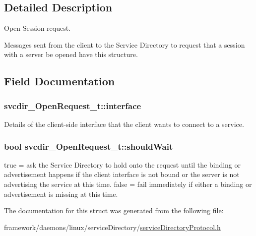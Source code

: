 \subsection{Detailed Description}
Open Session request.

Messages sent from the client to the Service Directory to request that a session with a server be opened have this structure. 

\subsection{Field Documentation}
\subsubsection[{\texorpdfstring{interface}{interface}}]{ svcdir\+\_\+\+Open\+Request\+\_\+t\+::interface}\hypertarget{structsvcdir___open_request__t_a2fc2736d6a0bb2bc23bd4aeee137b48d}{}\label{structsvcdir___open_request__t_a2fc2736d6a0bb2bc23bd4aeee137b48d}
Details of the client-\/side interface that the client wants to connect to a service. 
\subsubsection[{\texorpdfstring{should\+Wait}{shouldWait}}]{\setlength{\rightskip}{0pt plus 5cm}bool svcdir\+\_\+\+Open\+Request\+\_\+t\+::should\+Wait}\hypertarget{structsvcdir___open_request__t_aa6ac4a72f9f214a9a13995de28efeba8}{}\label{structsvcdir___open_request__t_aa6ac4a72f9f214a9a13995de28efeba8}
true = ask the Service Directory to hold onto the request until the binding or advertisement happens if the client interface is not bound or the server is not advertising the service at this time. false = fail immediately if either a binding or advertisement is missing at this time. 

The documentation for this struct was generated from the following file\+:\begin{DoxyCompactItemize}
\item 
framework/daemons/linux/service\+Directory/\hyperlink{service_directory_protocol_8h}{service\+Directory\+Protocol.\+h}\end{DoxyCompactItemize}
